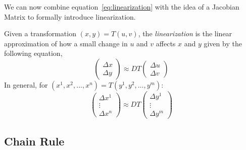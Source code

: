\documentclass[11pt]{article}
\newenvironment{mybox}
{\begin{tcolorbox}[colback=red!5!white,colframe=red!75!black]}
{\end{tcolorbox}}
\begin{document}
\noindent We can now combine equation~\ref{eq:linearization} with the idea of a Jacobian Matrix to formally introduce linearization.
\begin{mybox}
    Given a transformation $(x,y)=T(u,v)$, the \textit{linearization} is the linear approximation of how a small change in $u$ and $v$ affects $x$ and $y$ given by the following equation,
\begin{equation*}
\begin{pmatrix} \Delta x \\ \Delta y \end{pmatrix}
    \approx DT
    \begin{pmatrix} \Delta u \\ \Delta v \end{pmatrix}
\end{equation*}
    In general, for $(x^1,x^2,\ldots,x^n) = T(y^1,y^2,\ldots,y^m)$:
\begin{equation*}
    \begin{pmatrix} \Delta x^1 \\ \vdots \\ \Delta x^n \end{pmatrix}
    \approx DT
    \begin{pmatrix} \Delta y^1 \\ \vdots \\ \Delta y^m \end{pmatrix}
\end{equation*}
\end{mybox}
\subsection{Chain Rule}
\end{document}
